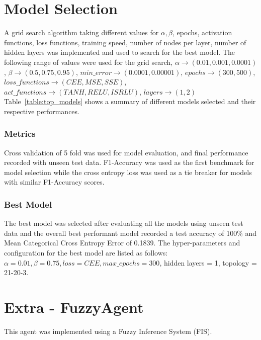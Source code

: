 \documentclass[10pt,journal,compsoc]{IEEEtran}
\begin{document}
\section{Model Selection}
A grid search algorithm taking different values for $\alpha, \beta$, epochs, activation functions, loss 
functions, training speed, number of nodes per layer, number of hidden layers was implemented and used
to search for the best model. The following range of values were used for the grid search, $\alpha \to (0.01, 0.001,
0.0001)$, $\beta \to (0.5, 0.75, 0.95)$, $min\_error \to (0.0001, 0.00001)$, $epochs \to (300, 500)$, 
$loss\_functions \to (CEE, MSE, SSE)$, $act\_functions \to (TANH, RELU, ISRLU)$, $layers \to (1, 2)$
Table~\ref{table:top_models} shows a summary of different models selected and their 
respective performances. 

\subsubsection*{Metrics}
Cross validation of 5 fold was used for model evaluation, and final performance recorded with unseen test
data. F1-Accuracy was used as the first benchmark for model selection while the cross entropy loss was 
used as a tie breaker for models with similar F1-Accuracy scores. 

\subsubsection*{Best Model}
The best model was selected after evaluating all the models using unseen test data and the overall best performant
model recorded a test accuracy of 100\% and Mean Categorical Cross Entropy Error of 0.1839.
The hyper-parameters and configuration for the best model are listed as follows:
$\alpha = 0.01,\beta = 0.75, loss=CEE, max\_epochs = 300$, hidden layers = 1, topology = 21-20-3. 


\section{Extra - FuzzyAgent}
This agent was implemented using a Fuzzy Inference System (FIS). 
\end{document}
